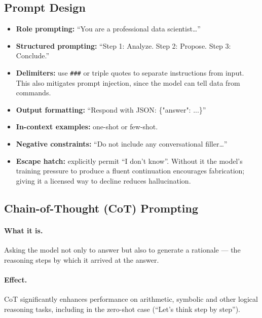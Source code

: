 \documentclass[11pt,a4paper]{article}
\begin{document}
\subsection{Prompt Design}

\begin{itemize}
\item \textbf{Role prompting:} ``You are a professional data scientist\ldots''
\item \textbf{Structured prompting:} ``Step 1: Analyze. Step 2: Propose. Step 3: Conclude.''
\item \textbf{Delimiters:} use \verb|###| or triple quotes to separate instructions from input.
  This also mitigates prompt injection, since the model can tell data from commands.
\item \textbf{Output formatting:} ``Respond with JSON: \{"answer": ...\}''
\item \textbf{In-context examples:} one-shot or few-shot.
\item \textbf{Negative constraints:} ``Do not include any conversational filler\ldots''
\item \textbf{Escape hatch:} explicitly permit ``I don't know''. Without it the model's
  training pressure to produce a fluent continuation encourages fabrication; giving it a
  licensed way to decline reduces hallucination.
\end{itemize}

\subsection{Chain-of-Thought (CoT) Prompting}

\paragraph{What it is.} Asking the model not only to answer but also to generate a rationale
--- the reasoning steps by which it arrived at the answer.

\paragraph{Effect.} CoT significantly enhances performance on arithmetic, symbolic and other
logical reasoning tasks, including in the zero-shot case (``Let's think step by step'').
\end{document}
